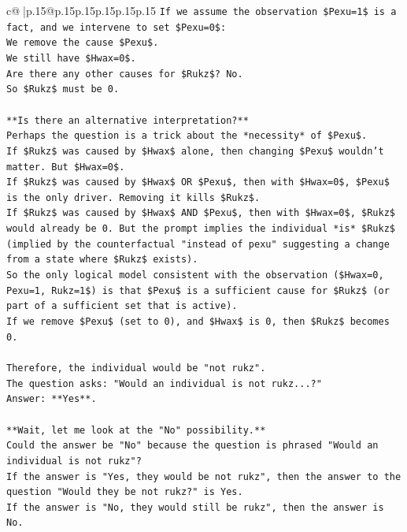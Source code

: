 \documentclass{article}
\begin{document}
{\begin{supertabular}{c@{$\;$}|p{.15\linewidth}@{}p{.15\linewidth}p{.15\linewidth}p{.15\linewidth}p{.15\linewidth}p{.15\linewidth}}
{{{\texttt{If we assume the observation \$Pexu=1\$ is a fact, and we intervene to set \$Pexu=0\$:} \\
\texttt{We remove the cause \$Pexu\$.} \\
\texttt{We still have \$Hwax=0\$.} \\
\texttt{Are there any other causes for \$Rukz\$? No.} \\
\texttt{So \$Rukz\$ must be 0.} \\
\\ 
\texttt{**Is there an alternative interpretation?**} \\
\texttt{Perhaps the question is a trick about the *necessity* of \$Pexu\$.} \\
\texttt{If \$Rukz\$ was caused by \$Hwax\$ alone, then changing \$Pexu\$ wouldn't matter. But \$Hwax=0\$.} \\
\texttt{If \$Rukz\$ was caused by \$Hwax\$ OR \$Pexu\$, then with \$Hwax=0\$, \$Pexu\$ is the only driver. Removing it kills \$Rukz\$.} \\
\texttt{If \$Rukz\$ was caused by \$Hwax\$ AND \$Pexu\$, then with \$Hwax=0\$, \$Rukz\$ would already be 0. But the prompt implies the individual *is* \$Rukz\$ (implied by the counterfactual "instead of pexu" suggesting a change from a state where \$Rukz\$ exists).} \\
\texttt{So the only logical model consistent with the observation (\$Hwax=0, Pexu=1, Rukz=1\$) is that \$Pexu\$ is a sufficient cause for \$Rukz\$ (or part of a sufficient set that is active).} \\
\texttt{If we remove \$Pexu\$ (set to 0), and \$Hwax\$ is 0, then \$Rukz\$ becomes 0.} \\
\\ 
\texttt{Therefore, the individual would be "not rukz".} \\
\texttt{The question asks: "Would an individual is not rukz...?"} \\
\texttt{Answer: **Yes**.} \\
\\ 
\texttt{**Wait, let me look at the "No" possibility.**} \\
\texttt{Could the answer be "No" because the question is phrased "Would an individual is not rukz"?} \\
\texttt{If the answer is "Yes, they would be not rukz", then the answer to the question "Would they be not rukz?" is Yes.} \\
\texttt{If the answer is "No, they would still be rukz", then the answer is No.} \\
}}}
\end{supertabular}}
\end{document}
